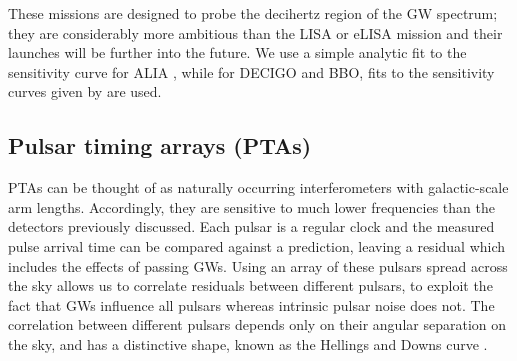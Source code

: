 These missions are designed to probe the decihertz region of the GW spectrum; they are considerably more ambitious than the LISA or eLISA mission and their launches will be further into the future. We use a simple analytic fit to the sensitivity curve for ALIA , while for DECIGO and BBO, fits to the sensitivity curves given by \citet{2011PhRvD..83d4011Y} are used.

\subsection{Pulsar timing arrays (PTAs)}\label{sec:PTAgeneralproperties}

PTAs can be thought of as naturally occurring interferometers with galactic-scale arm lengths. Accordingly, they are sensitive to much lower frequencies than the detectors previously discussed. Each pulsar is a regular clock and the measured pulse arrival time can be compared against a prediction, leaving a residual which includes the effects of passing GWs. Using an array of these pulsars spread across the sky allows us to correlate residuals between different pulsars, to exploit the fact that GWs influence all pulsars whereas intrinsic pulsar noise does not. The correlation between different pulsars depends only on their angular separation on the sky, and has a distinctive shape, known as the Hellings and Downs curve \citep{HellingsDowns}.

